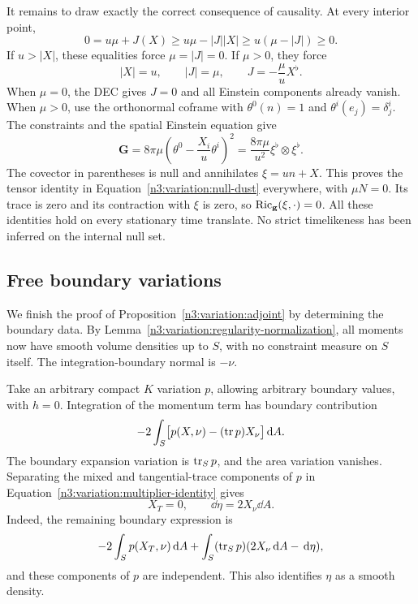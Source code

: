 It remains to draw exactly the correct consequence of causality.
At every interior point,
\begin{equation}
 0=u\mu+J(X)
    \ge u\mu-|J||X|
    \ge u(\mu-|J|)\ge0.
 \label{n3:variation:causal-equalities}
\end{equation}
If $u>|X|$, these equalities force $\mu=|J|=0$.
If $\mu>0$, they force
\begin{equation}
 |X|=u,\qquad |J|=\mu,\qquad
 J=-\frac\mu u X^\flat.
 \label{n3:variation:dust-alignment}
\end{equation}
When $\mu=0$, the DEC gives $J=0$ and all Einstein components
already vanish.  When $\mu>0$, use the orthonormal coframe with
$\theta^0(n)=1$ and $\theta^i(e_j)=\delta^i_j$.  The constraints
and the spatial Einstein equation give
\[
 \mathbf G
  =8\pi\mu\left(\theta^0-\frac{X_i}{u}\theta^i\right)^2
  =\frac{8\pi\mu}{u^2}\xi^\flat\otimes\xi^\flat.
\]
The covector in parentheses is null and annihilates
$\xi=un+X$.  This proves the tensor identity in
Equation~\eqref{n3:variation:null-dust} everywhere, with
$\mu N=0$.  Its trace is zero and its contraction with $\xi$ is
zero, so $\operatorname{Ric}_{\mathbf g}(\xi,\cdot)=0$.  All these identities
hold on every stationary time translate.  No strict timelikeness
has been inferred on the internal null set.

\subsection{Free boundary variations}
\label{n3:variation:boundary-subsection}

We finish the proof of Proposition~\ref{n3:variation:adjoint} by
determining the boundary data.  By
Lemma~\ref{n3:variation:regularity-normalization}, all moments now
have smooth volume densities up to $S$, with no constraint measure
on $S$ itself.  The integration-boundary normal is $-\nu$.

Take an arbitrary compact $K$ variation $p$, allowing arbitrary
boundary values, with $h=0$.  Integration of the momentum term has
boundary contribution
\[
 -2\int_S\bigl[p(X,\nu)-(\operatorname{tr} p)X_\nu\bigr]\,\mathrm d A.
\]
The boundary expansion variation is $\operatorname{tr}_Sp$, and the area variation
vanishes.  Separating the mixed and tangential-trace components of
$p$ in Equation~\eqref{n3:variation:multiplier-identity} gives
\begin{equation}
 X_T=0,\qquad \dd\eta=2X_\nu\dd A.
 \label{n3:variation:eta-density}
\end{equation}
Indeed, the remaining boundary expression is
\[
 -2\int_S p(X_T,\nu)\,\mathrm d A
      +\int_S(\operatorname{tr}_Sp)(2X_\nu\,\mathrm d A-\,\mathrm d\eta),
\]
and these components of $p$ are independent.  This also identifies
$\eta$ as a smooth density.

